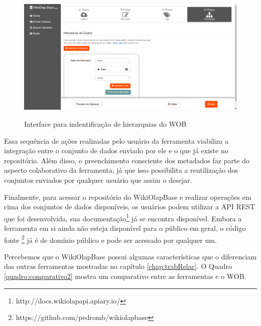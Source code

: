 \begin{figure}[!htb]
    \centering
    \caption{Interface para indentificação de hierarquias do WOB}
    \includegraphics[width=1\textwidth]{./04-figuras/wob-hierarquia}
    \label{fig:wob-hierarquia}
\end{figure}

Essa sequência de ações realizadas pelo usuário da ferramenta viabiliza a integração entre
o conjunto de dados enviado por ele e o que já existe no repositório. Além disso, o preenchimento
consciente dos metadados faz parte do aspecto colaborativo da ferramenta, já que isso 
possibilita a reutilização dos conjuntos enviados por qualquer usuário que assim o desejar.

Finalmente, para acessar o repositório do WikiOlapBase e realizar operações em cima dos 
conjuntos de dados disponíveis, os usuários podem utilizar a API REST que foi desenvolvida, 
sua documentação\footnote{http://docs.wikiolapapi.apiary.io/} já se encontra disponível. Embora a ferramenta em si ainda não esteja
disponível para o público em geral, o código fonte \footnote{https://github.com/pedromb/wikiolapbase} já é de domínio público e pode ser acessado
por qualquer um.

Percebemos que o WikiOlapBase possui algumas características que o diferenciam das outras ferramentas
mostradas no capítulo \ref{chap:trabRelac}. O Quadro \ref{quadro:comparativo2} mostra um 
comparativo entre as ferramentas e o WOB.

